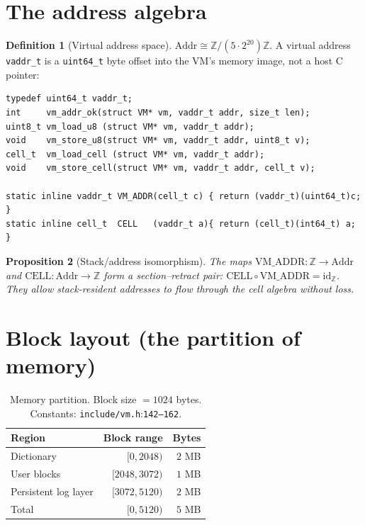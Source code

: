 \documentclass[11pt,letterpaper,openany]{book}
\theoremstyle{definition}
\newtheorem{definition}{Definition}[chapter]
\theoremstyle{plain}
\newtheorem{proposition}[definition]{Proposition}
\newcommand{\sourceref}[2]{\texttt{#1}:\texttt{#2}}
\begin{document}
\section{The address algebra}

\begin{definition}[Virtual address space]\label{def:vaddr}
$\mathrm{Addr} \cong \mathbb{Z}/(5\!\cdot\!2^{20})\mathbb{Z}$. A virtual
address \texttt{vaddr\_t} is a \texttt{uint64\_t} byte offset into the VM's
memory image, not a host C pointer:
\end{definition}

\begin{lstlisting}[caption={Address algebra (\texttt{include/vm.h}:118--137).},label={lst:vaddr}]
typedef uint64_t vaddr_t;
int     vm_addr_ok(struct VM* vm, vaddr_t addr, size_t len);
uint8_t vm_load_u8 (struct VM* vm, vaddr_t addr);
void    vm_store_u8(struct VM* vm, vaddr_t addr, uint8_t v);
cell_t  vm_load_cell (struct VM* vm, vaddr_t addr);
void    vm_store_cell(struct VM* vm, vaddr_t addr, cell_t v);

static inline vaddr_t VM_ADDR(cell_t c) { return (vaddr_t)(uint64_t)c; }
static inline cell_t  CELL   (vaddr_t a){ return (cell_t)(int64_t) a; }
\end{lstlisting}

\begin{proposition}[Stack/address isomorphism]
The maps $\mathrm{VM\_ADDR}:\mathbb{Z}\to\mathrm{Addr}$ and
$\mathrm{CELL}:\mathrm{Addr}\to\mathbb{Z}$ form a section--retract pair:
$\mathrm{CELL}\circ\mathrm{VM\_ADDR} = \mathrm{id}_{\mathbb{Z}}$. They allow
stack-resident addresses to flow through the cell algebra without loss.
\end{proposition}

\section{Block layout (the partition of memory)}

\begin{table}[H]
  \centering\small
  \begin{tabular}{l r r}
    \toprule
    Region & Block range & Bytes \\
    \midrule
    Dictionary           & $[0, 2048)$    & $2$ MB \\
    User blocks          & $[2048, 3072)$ & $1$ MB \\
    Persistent log layer & $[3072, 5120)$ & $2$ MB \\
    \midrule
    Total                & $[0, 5120)$    & $5$ MB \\
    \bottomrule
  \end{tabular}
  \caption{Memory partition. Block size $= 1024$ bytes. Constants:
    \sourceref{include/vm.h}{142--162}.}
\end{table}
\end{document}
